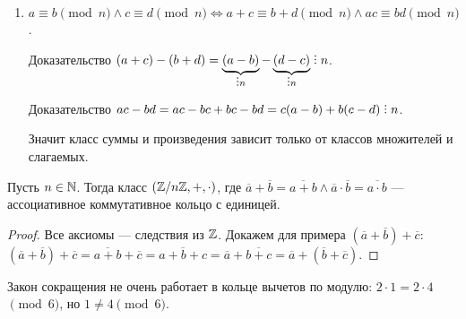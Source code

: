  \begin{enumerate}
     \item $a \equiv b \pmod{n} \land c \equiv d \pmod{n} \iff a+c \equiv b+d \pmod{n} \land ac \equiv bd \pmod{n}$. 

         Доказательство  $(a+c) - (b+d) = \underbrace{(a-b)}_{\divby n} - \underbrace{(d-c)}_{\divby n} \divby n$. 

         Доказательство $ac - bd = ac - bc + bc - bd = c (a-b) + b(c-d) \divby n$.

         Значит класс суммы и произведения зависит только от классов множителей и слагаемых.
\end{enumerate}
\begin{theorem}
    Пусть $n \in \mathbb{N}$. Тогда класс $(\mathbb{Z} / n\mathbb{Z}, +, \cdot)$, где $\overline{a}+\overline{b} = \overline{a+b} \land \overline{a} \cdot \overline{b} = \overline{a \cdot b}$ --- ассоциативное коммутативное кольцо с единицей.
\end{theorem}
\begin{proof}
	Все аксиомы --- следствия из $\mathbb{Z}$. Докажем для примера  $(\overline{a} + \overline{b}) + \overline{c}$: $(\overline{a} + \overline{b}) + \overline{c} = \overline{a+b} + \overline{c} = \overline{a+b+c} = \overline{a} + \overline{b + c} = \overline{a} + (\overline{b} + \overline{c})$.
\end{proof}
\slashn
Закон сокращения не очень работает в кольце вычетов по модулю: $2 \cdot 1 = 2 \cdot 4$ $\pmod 6$, но  $1 \neq 4 \pmod 6$.

